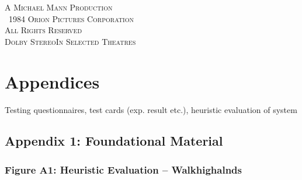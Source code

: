 \documentclass[11pt, english]{article}
\begin{document}
	\vspace{\fill}

	\begin{center}
		\textsc{A Michael Mann Production}\\
		\textcopyright\ \textsc{1984 Orion Pictures Corporation}\\
		\small{\textsc{All Rights Reserved}}\\
		\small{\textsc{Dolby Stereo}\texttrademark \textsc{In Selected Theatres}}
	\end{center}

\newpage



\section*{Appendices}

	Testing questionnaires, test cards (exp. result etc.), heuristic evaluation of system

	\subsection*{Appendix 1: Foundational Material}

		\subsubsection*{Figure A1: Heuristic Evaluation -- Walkhighalnds}
\end{document}
